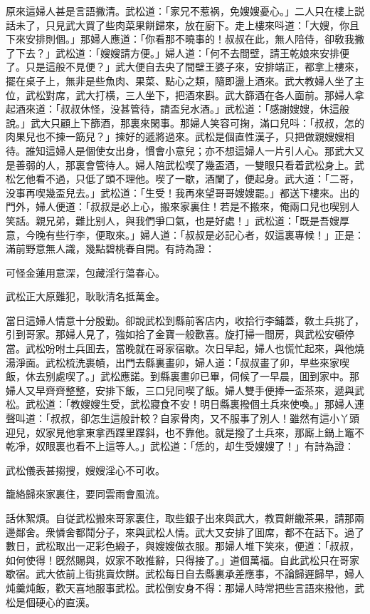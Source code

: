 原來這婦人甚是言語撇清。武松道：「家兄不惹祸，免嫂嫂憂心。」二人只在樓上説話未了，只見武大買了些肉菜果餅歸來，放在廚下。走上樓來呌道：「大嫂，你且下來安排則個。」那婦人應道：「你看那不曉事的！叔叔在此，無人陪侍，卻敎我撇了下去？」武松道：「嫂嫂請方便。」婦人道：「何不去間壁，請王乾娘來安排便了。只是這般不見便？」武大便自去央了間壁王婆子來，安排端正，都拿上樓來，擺在桌子上，無非是些魚肉、果菜、點心之類，隨即盪上酒來。武大教婦人坐了主位，武松對席，武大打横，三人坐下，把酒來斟。武大篩酒在各人面前。那婦人拿起酒來道：「叔叔休怪，没甚管待，請盃兒水酒。」武松道：「感謝嫂嫂，休這般說。」武大只顧上下篩酒，那裏來閑事。那婦人笑容可掬，滿口兒呌：「叔叔，怎的肉果兒也不揀一筯兒？」揀好的遞將過來。武松是個直性漢子，只把做親嫂嫂相待。誰知這婦人是個使女出身，慣會小意兒；亦不想這婦人一片引人心。那武大又是善弱的人，那裏會管待人。婦人陪武松喫了幾盃酒，一雙眼只看着武松身上。武松乞他看不過，只低了頭不理他。喫了一歇，酒闌了，便起身。武大道：「二哥，没事再喫幾盃兒去。」武松道：「生受！我再來望哥哥嫂嫂罷。」都送下樓來。出的門外，婦人便道：「叔叔是必上心，搬來家裏住！若是不搬來，俺兩口兒也喫别人笑話。親兄弟，難比别人，與我們爭口氣，也是好處！」武松道：「既是吾嫂厚意，今晚有些行李，便取來。」婦人道：「叔叔是必記心者，奴這裏專候！」正是：滿前野意無人識，幾點碧桃春自開。有詩為證：

\begin{myquote}
可怪金蓮用意深，包藏淫行蕩春心。

武松正大原難犯，耿耿清名抵萬金。
\end{myquote}

當日這婦人情意十分殷勤。卻說武松到縣前客店内，收拾行李鋪蓋，敎土兵挑了，引到哥家。那婦人見了，強如拾了金寶一般歡喜。旋打掃一間房，與武松安頓停當。武松吩咐土兵囬去，當晚就在哥家宿歇。次日早起，婦人也慌忙起來，與他燒湯淨面。武松梳洗裹幘，出門去縣裏畫卯，婦人道：「叔叔畫了卯，早些來家喫飯，休去别處喫了。」武松應諾。到縣裏畫卯已畢，伺候了一早晨，囬到家中。那婦人又早齊齊整整，安排下飯，三口兒同喫了飯。婦人雙手便捧一盃茶來，遞與武松。武松道：「教嫂嫂生受，武松寢食不安！明日縣裏撥個土兵來使喚。」那婦人連聲叫道：「叔叔，卻怎生這般計較？自家骨肉，又不服事了別人！雖然有這小丫頭迎兒，奴家見他拿東拿西蹀里蹀斜，也不靠他。就是撥了土兵來，那廝上鍋上竈不乾凈，奴眼裏也看不上這等人。」武松道：「恁的，却生受嫂嫂了！」有詩為證：

\begin{myquote}
武松儀表甚搊搜，嫂嫂淫心不可收。

籠絡歸來家裏住，要同雲雨會風流。
\end{myquote}

話休絮煩。自従武松搬來哥家裏住，取些銀子出來與武大，教買餅饊茶果，請那兩邊鄰舍。衆憐舍都鬦分子，來與武松人情。武大又安排了囬席，都不在話下。過了數日，武松取出一疋彩色緞子，與嫂嫂做衣服。那婦人堆下笑來，便道：「叔叔，如何使得！旣然賜與，奴家不敢推辭，只得接了。」道個萬福。自此武松只在哥家歇宿。武大依前上街挑賣炊餅。武松每日自去縣裏承差應事，不論歸遲歸早，婦人炖羹炖飯，歡天喜地服事武松。武松倒安身不得：那婦人時常把些言語來撥他，武松是個硬心的直漢。


